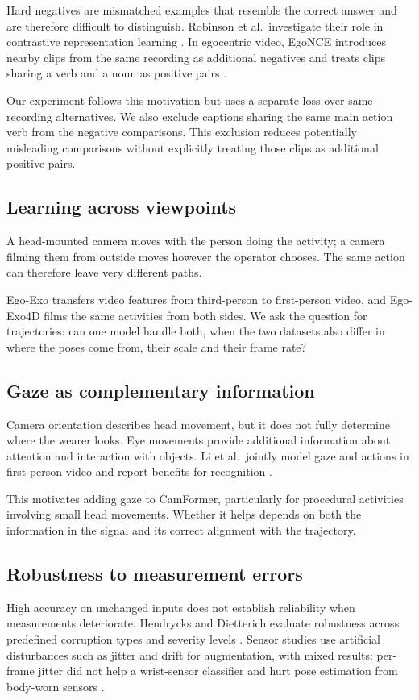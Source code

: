 \documentclass[10pt,twocolumn,letterpaper]{article}
\begin{document}
Hard negatives are mismatched examples that resemble the correct answer and are therefore difficult to
distinguish. Robinson et al.\ investigate their role in contrastive representation learning
\cite{robinson2021hard}. In egocentric video, EgoNCE introduces nearby clips from the same recording as additional
negatives and treats clips sharing a verb and a noun as positive pairs \cite{lin2022egovlp}.

Our experiment follows this motivation but uses a separate loss over same-recording alternatives. We also exclude
captions sharing the same main action verb from the negative comparisons. This exclusion reduces potentially
misleading comparisons without explicitly treating those clips as additional positive pairs.

\subsection{Learning across viewpoints}
A head-mounted camera moves with the person doing the activity; a camera filming them from outside moves however
the operator chooses. The same action can therefore leave very different paths.

Ego-Exo \cite{li2021egoexo} transfers video features from third-person to first-person video, and Ego-Exo4D
\cite{grauman2024egoexo4d} films the same activities from both sides. We ask the question for trajectories: can one
model handle both, when the two datasets also differ in where the poses come from, their scale and their frame
rate?

\subsection{Gaze as complementary information}
Camera orientation describes head movement, but it does not fully determine where the wearer looks. Eye movements
provide additional information about attention and interaction with objects. Li et al.\ jointly model gaze and
actions in first-person video and report benefits for recognition \cite{li2018eye}.

This motivates adding gaze to CamFormer, particularly for procedural activities involving small head movements.
Whether it helps depends on both the information in the signal and its correct alignment with the trajectory.

\subsection{Robustness to measurement errors}
High accuracy on unchanged inputs does not establish reliability when measurements deteriorate. Hendrycks and
Dietterich evaluate robustness across predefined corruption types and severity levels
\cite{hendrycks2019corruptions}. Sensor studies use artificial disturbances such as jitter and drift for
augmentation, with mixed results: per-frame jitter did not help a wrist-sensor classifier \cite{um2017augmentation}
and hurt pose estimation from body-worn sensors \cite{wu2025moda}.
\end{document}
